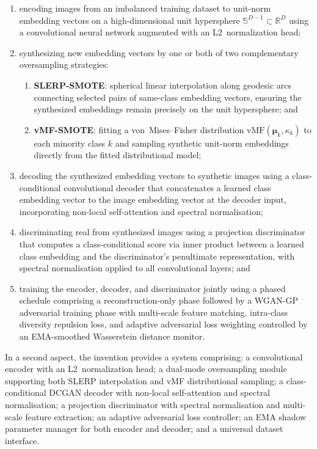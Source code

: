 \documentclass[12pt,letterpaper]{article}
\newcommand{\bmu}{\bm{\mu}}
\newcommand{\RR}{\mathbb{R}}
\newcommand{\Sphere}{\mathbb{S}}
\begin{document}
\begin{enumerate}[label=(\alph*),leftmargin=2em]
\item encoding images from an imbalanced training dataset to unit-norm
  embedding vectors on a high-dimensional unit hypersphere
  $\Sphere^{D-1} \subset \RR^D$ using a convolutional neural network
  augmented with an L2~normalization head;

\item synthesizing new embedding vectors by one or both of two
  complementary oversampling strategies:
  \begin{enumerate}[label=(\roman*)]
    \item \textbf{SLERP-SMOTE}: spherical linear interpolation along
      geodesic arcs connecting selected pairs of same-class embedding
      vectors, ensuring the synthesized embeddings remain precisely on the
      unit hypersphere; and
    \item \textbf{vMF-SMOTE}: fitting a von~Mises--Fisher distribution
      $\text{vMF}(\bmu_k, \kappa_k)$ to each minority class $k$ and
      sampling synthetic unit-norm embeddings directly from the fitted
      distributional model;
  \end{enumerate}

\item decoding the synthesized embedding vectors to synthetic images using
  a class-conditional convolutional decoder that concatenates a learned
  class embedding vector to the image embedding vector at the decoder
  input, incorporating non-local self-attention and spectral normalisation;

\item discriminating real from synthesized images using a projection
  discriminator~\cite{miyatokoyama2018} that computes a class-conditional
  score via inner product between a learned class embedding and the
  discriminator's penultimate representation, with spectral normalisation
  applied to all convolutional layers; and

\item training the encoder, decoder, and discriminator jointly using a
  phased schedule comprising a reconstruction-only phase followed by a
  WGAN-GP adversarial training phase with multi-scale feature matching,
  intra-class diversity repulsion loss, and adaptive adversarial loss
  weighting controlled by an EMA-smoothed Wasserstein distance monitor.
\end{enumerate}

In a second aspect, the invention provides a system comprising: a
convolutional encoder with an L2~normalization head; a dual-mode
oversampling module supporting both SLERP interpolation and vMF distributional
sampling; a class-conditional DCGAN decoder with non-local self-attention and
spectral normalisation; a projection discriminator with spectral
normalisation and multi-scale feature extraction; an adaptive adversarial
loss controller; an EMA shadow parameter manager for both encoder and decoder;
and a universal dataset interface.
\end{document}
